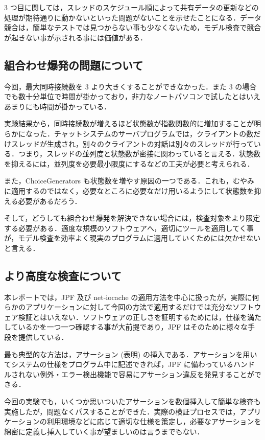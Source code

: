 \documentclass[a4j,12pt]{jarticle}
\begin{document}
3 つ目に関しては，スレッドのスケジュール順によって共有データの更新などの処理が期待通りに動かないといった問題がないことを示せたことになる．データ競合は，簡単なテストでは見つからない事も少なくないため，モデル検査で競合が起きない事が示される事には価値がある．

\subsection{組合わせ爆発の問題について}

今回，最大同時接続数を 3 より大きくすることができなかった．また 3 の場合でも数十分単位で時間が掛かっており，非力なノートパソコンで試したとはいえあまりにも時間が掛かっている．

実験結果から，同時接続数が増えるほど状態数が指数関数的に増加することが明らかになった．チャットシステムのサーバプログラムでは，クライアントの数だけスレッドが生成され，別々のクライアントの対話は別々のスレッドが行っている．つまり，スレッドの並列度と状態数が密接に関わっていると言える．状態数を抑えるには，並列度を必要最小限度にするなどの工夫が必要と考えられる．

また，ChoiceGenerators も状態数を増やす原因の一つである．これも，むやみに適用するのではなく，必要なところに必要なだけ用いるようにして状態数を抑える必要があるだろう．

そして，どうしても組合わせ爆発を解決できない場合には，検査対象をより限定する必要がある．適度な規模のソフトウェアへ，適切にツールを適用してく事が，モデル検査を効率よく現実のプログラムに適用していくためには欠かせないと言える．

\newpage

\subsection{より高度な検査について}

本レポートでは，JPF 及び net-iocache の適用方法を中心に扱ったが，実際に何らかのアプリケーションに対して今回の方法で適用するだけでは充分なソフトウェア検証とはいえない．ソフトウェアの正しさを証明するためには，仕様を満たしているかを一つ一つ確認する事が大前提であり，JPF はそのために様々な手段を提供している．

最も典型的な方法は，アサーション (表明) の挿入である．アサーションを用いてシステムの仕様をプログラム中に記述できれば，JPF に備わっているハンドルされない例外・エラー検出機能で容易にアサーション違反を発見することができる．

今回の実験でも，いくつか思いついたアサーションを数個挿入して簡単な検査も実施したが，問題なくパスすることができた．実際の検証プロセスでは，アプリケーションの利用環境などに応じて適切な仕様を策定し，必要なアサーションを綿密に定義し挿入していく事が望ましいのは言うまでもない．
\end{document}
